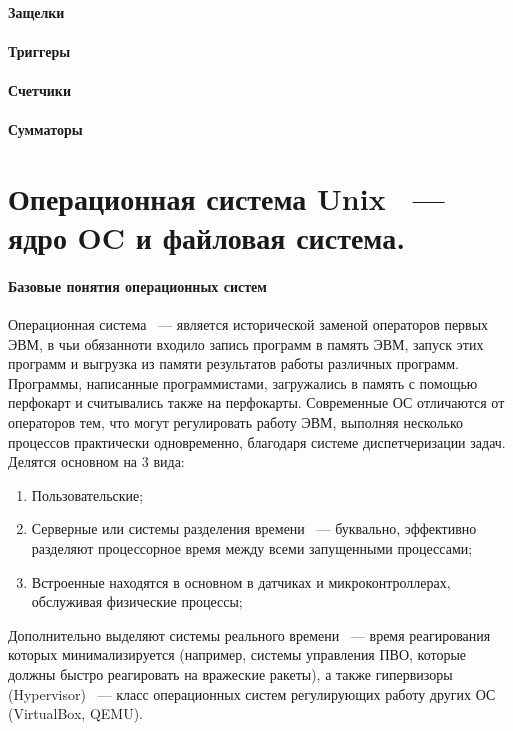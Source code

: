 \documentclass[11pt]{article}
\begin{document}
	\paragraph{Защелки}
	\paragraph{Триггеры}
	\paragraph{Счетчики}
	\paragraph{Сумматоры}
	\section{Операционная система Unix ~--- ядро OC и файловая система.}
	\paragraph{Базовые понятия операционных систем}
	Операционная система ~--- является исторической заменой операторов первых ЭВМ, в чьи обязанноти входило запись программ в память ЭВМ, запуск этих программ и выгрузка из памяти результатов работы различных программ. Программы, написанные программистами, загружались в память с помощью перфокарт и считывались также на перфокарты. Современные ОС отличаются от операторов тем, что могут регулировать работу ЭВМ, выполняя несколько процессов практически одновременно, благодаря системе диспетчеризации задач. Делятся основном на 3 вида:
	\begin{enumerate}
		\item Пользовательские;
		\item Серверные или системы разделения времени ~--- буквально, эффективно разделяют процессорное время между всеми запущенными процессами;
		\item Встроенные находятся в основном в датчиках и микроконтроллерах, обслуживая физические процессы;
	\end{enumerate}
	Дополнительно выделяют системы реального времени ~--- время реагирования которых минимализируется (например, системы управления ПВО, которые должны быстро реагировать на вражеские ракеты), а также гипервизоры (Hypervisor) ~--- класс операционных систем регулирующих работу других ОС (VirtualBox, QEMU).
\end{document}
